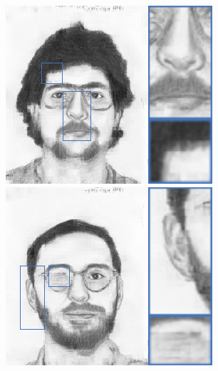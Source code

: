 \documentclass[10pt,twocolumn,letterpaper]{article}
\begin{document}
\begin{figure}[htbp]
{\begin{minipage}[b]{0.13\linewidth}
\includegraphics[width=0.99\linewidth]{img/sketch_result/mrf_s3.png}
\includegraphics[width=0.99\linewidth]{img/sketch_result/mrf_s4.png}
\end{minipage}
}
\end{figure}
\end{document}
